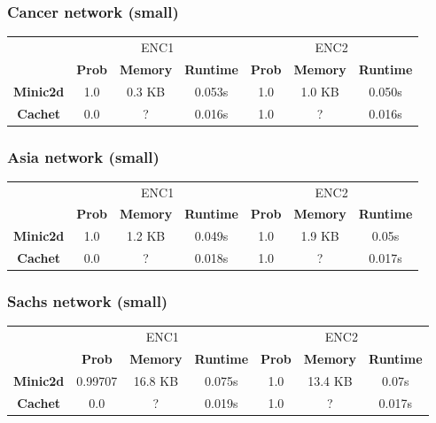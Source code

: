 \subsubsection{Cancer network (small)}
\begin{table}[H]
    \centering
    \begin{tabular}{c|c|c|c|c|c|c|}
    \cline{2-7}
            & \multicolumn{3}{c|}{ENC1} & \multicolumn{3}{c|}{ENC2} \\ \cline{2-7}
      & \textbf{Prob}  & \textbf{Memory}  & \textbf{Runtime} & \textbf{Prob}  & \textbf{Memory}  & \textbf{Runtime} \\ \cline{1-7}
      \textbf{Minic2d} & 1.0  & 0.3 KB    & 0.053s   & 1.0    & 1.0 KB    & 0.050s \\
      \hline
    \textbf{Cachet}  & 0.0  & ?    & 0.016s       & 1.0     & ?    & 0.016s    \\ \cline{1-7}
    \end{tabular}
\end{table}

\subsubsection{Asia network (small)}
\begin{table}[H]
    \centering
    \begin{tabular}{c|c|c|c|c|c|c|}
    \cline{2-7}
            & \multicolumn{3}{c|}{ENC1} & \multicolumn{3}{c|}{ENC2} \\ \cline{2-7}
      & \textbf{Prob}  & \textbf{Memory}  & \textbf{Runtime} & \textbf{Prob}  & \textbf{Memory}  & \textbf{Runtime} \\ \cline{1-7}
      \textbf{Minic2d} & 1.0  & 1.2 KB    & 0.049s   & 1.0    & 1.9 KB    & 	 0.05s \\
      \hline
    \textbf{Cachet}  & 0.0  & ?    & 0.018s       & 1.0     & ?    & 0.017s    \\ \cline{1-7}
    \end{tabular}
\end{table}

\subsubsection{Sachs network (small)}
\begin{table}[H]
    \centering
    \begin{tabular}{c|c|c|c|c|c|c|}
    \cline{2-7}
            & \multicolumn{3}{c|}{ENC1} & \multicolumn{3}{c|}{ENC2} \\ \cline{2-7}
      & \textbf{Prob}  & \textbf{Memory}  & \textbf{Runtime} & \textbf{Prob}  & \textbf{Memory}  & \textbf{Runtime} \\ \cline{1-7}
      \textbf{Minic2d} & 0.99707  & 16.8 KB    & 0.075s   & 1.0    & 13.4 KB   & 	0.07s \\
      \hline
    \textbf{Cachet}  & 0.0  & ?    & 0.019s       & 1.0     & ?    & 0.017s    \\ \cline{1-7}
    \end{tabular}
\end{table}

